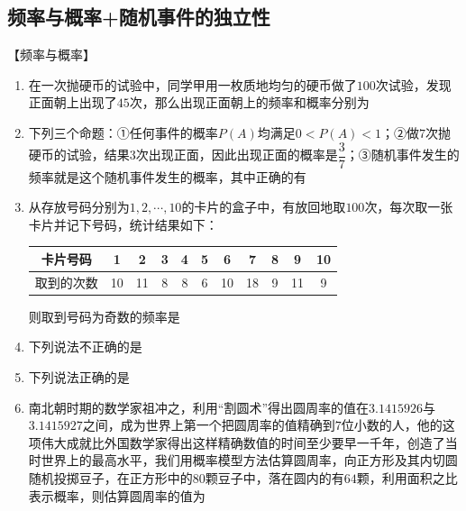 \clearpage

\subsection*{频率与概率+随机事件的独立性}

【频率与概率】

\begin{enumerate}

\item 在一次抛硬币的试验中，同学甲用一枚质地均匀的硬币做了$100$次试验，发现正面朝上出现了$45$次，那么出现正面朝上的频率和概率分别为

\item 下列三个命题：①任何事件的概率$P(A)$均满足$0<P(A)<1$；②做$7$次抛硬币的试验，结果$3$次出现正面，因此出现正面的概率是$\dfrac{3}{7}$；③随机事件发生的频率就是这个随机事件发生的概率，其中正确的有

\item 从存放号码分别为$1,2,\cdots,10$的卡片的盒子中，有放回地取$100$次，每次取一张卡片并记下号码，统计结果如下：
\begin{center}
\begin{tabular}{|c|c|c|c|c|c|c|c|c|c|c|}
\hline
卡片号码 & 1 & 2 & 3 & 4 & 5 & 6 & 7 & 8 & 9 & 10 \\
\hline
取到的次数 & 10 & 11 & 8 & 8 & 6 & 10 & 18 & 9 & 11 & 9 \\
\hline
\end{tabular}
\end{center}
则取到号码为奇数的频率是

\item 下列说法不正确的是

\item 下列说法正确的是

\item 南北朝时期的数学家祖冲之，利用“割圆术”得出圆周率的值在$3.1415926$与$3.1415927$之间，成为世界上第一个把圆周率的值精确到$7$位小数的人，他的这项伟大成就比外国数学家得出这样精确数值的时间至少要早一千年，创造了当时世界上的最高水平，我们用概率模型方法估算圆周率，向正方形及其内切圆随机投掷豆子，在正方形中的$80$颗豆子中，落在圆内的有$64$颗，利用面积之比表示概率，则估算圆周率的值为

\end{enumerate}

